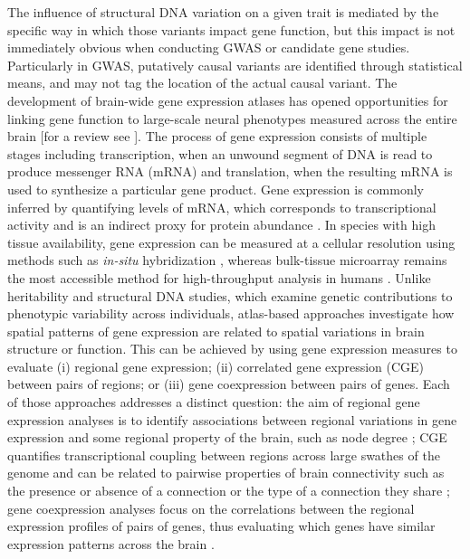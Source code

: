 The influence of structural DNA variation on a given trait is mediated by the specific way in which those variants impact gene function, but this impact is not immediately obvious when conducting GWAS or candidate gene studies. Particularly in GWAS, putatively causal variants are identified through statistical means, and may not tag the location of the actual causal variant. The development of brain-wide gene expression atlases \citep{Harris2010,Hawrylycz2012,Lein2007a} has opened opportunities for linking gene function to large-scale neural phenotypes measured across the entire brain [for a review see \citet{Fornito2019}]. The process of gene expression consists of multiple stages including transcription, when an unwound segment of DNA is read to produce messenger RNA (mRNA) and translation, when the resulting mRNA is used to synthesize a particular gene product. Gene expression is commonly inferred by quantifying levels of mRNA, which corresponds to transcriptional activity and is an indirect proxy for protein abundance \citep{Liu2016}. In species with high tissue availability, gene expression can be measured at a cellular resolution using methods such as \textit{in-situ} hybridization \citep{Lein2007a,Unger2010}, whereas bulk-tissue microarray \citep{Schulze2001} remains the most accessible method for high-throughput analysis in humans \citep{Hawrylycz2012}. Unlike heritability and structural DNA studies, which examine genetic contributions to phenotypic variability across individuals, atlas-based approaches investigate how spatial patterns of gene expression are related to spatial variations in brain structure or function. This can be achieved by using gene expression measures to evaluate (i) regional gene expression; (ii) correlated gene expression (CGE) between pairs of regions; or (iii) gene coexpression between pairs of genes. Each of those approaches addresses a distinct question: the aim of regional gene expression analyses is to identify associations between regional variations in gene expression and some regional property of the brain, such as node degree \citep{French2011}; CGE quantifies transcriptional coupling between regions across large swathes of the genome and can be related to pairwise properties of brain connectivity such as the presence or absence of a connection or the type of a connection they share \mbox{\citep{Arnatkeviciute2018,Fulcher2016,Richiardi2015}}; gene coexpression analyses focus on the correlations between the regional expression profiles of pairs of genes, thus evaluating which genes have similar expression patterns across the brain \citep{Forest2017}.

